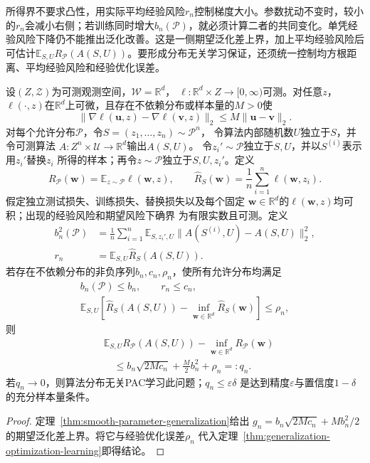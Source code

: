 所得界不要求凸性，用实际平均经验风险$r_n$控制梯度大小。参数扰动不变时，较小的$r_n$会减小右侧；若训练同时增大$b_n(\mathcal P)$，就必须计算二者的共同变化。单凭经验风险下降仍不能推出泛化改善。这是一侧期望泛化差上界，加上平均经验风险后可估计$\mathbb E_{S,U}R_{\mathcal P}(A(S,U))$。要形成分布无关学习保证，还须统一控制均方根距离、平均经验风险和经验优化误差。

\begin{theorem}[光滑损失下参数稳定性与可学习性]
\label{thm:smooth-parameter-learning}
设$(Z,\mathcal Z)$为可测观测空间，$\mathcal W=\mathbb R^d$，
$\ell:\mathbb R^d\times Z\to[0,\infty)$可测。对任意$z$，
$\ell(\cdot,z)$在$\mathbb R^d$上可微，且存在不依赖分布或样本量的$M>0$使
\[
 \|\nabla\ell(\bm u,z)-\nabla\ell(\bm v,z)\|_2
 \leq M\|\bm u-\bm v\|_2.
\]
对每个允许分布$\mathcal P$，令$S=(z_1,\ldots,z_n)\sim\mathcal P^n$，
令算法内部随机数$U$独立于$S$，并令可测算法
$A:Z^n\times\mathcal U\to\mathbb R^d$输出$A(S,U)$。
令$z_i'\sim\mathcal P$独立于$S,U$，并以$S^{(i)}$表示用$z_i'$替换$z_i$
所得的样本；再令$z\sim\mathcal P$独立于$S,U,z_i'$。定义
\[
 R_{\mathcal P}(\bm w)=\mathbb E_{z\sim\mathcal P}\ell(\bm w,z),
 \qquad
 \hat R_S(\bm w)=\frac1n\sum_{i=1}^n\ell(\bm w,z_i).
\]
假定独立测试损失、训练损失、替换损失以及每个固定
$\bm w\in\mathbb R^d$的$\ell(\bm w,z)$均可积；出现的经验风险和期望风险下确界
为有限实数且可测。定义
\[
\begin{aligned}
 b_n^2(\mathcal P)
 &=\frac1n\sum_{i=1}^n\mathbb E_{S,z_i',U}
   \|A(S^{(i)},U)-A(S,U)\|_2^2,\\
 r_n&=\mathbb E_{S,U}\hat R_S(A(S,U)).
\end{aligned}
\]
若存在不依赖分布的非负序列$b_n,c_n,\rho_n$，使所有允许分布均满足
\begin{gather*}
 b_n(\mathcal P)\leq b_n,\qquad r_n\leq c_n,\\
 \mathbb E_{S,U}[\hat R_S(A(S,U))-\inf_{\bm w\in\mathbb R^d}
 \hat R_S(\bm w)]\leq\rho_n,
\end{gather*}
则
\begin{align*}
 &\mathbb E_{S,U}R_{\mathcal P}(A(S,U))
 -\inf_{\bm w\in\mathbb R^d}R_{\mathcal P}(\bm w)\\
 &\quad\leq b_n\sqrt{2Mc_n}+\frac M2b_n^2+\rho_n=:q_n.
\end{align*}
若$q_n\to0$，则算法分布无关PAC学习此问题；$q_n\leq\varepsilon\delta$
是达到精度$\varepsilon$与置信度$1-\delta$的充分样本量条件。
\end{theorem}
\begin{proof}
定理~\ref{thm:smooth-parameter-generalization}给出
$g_n=b_n\sqrt{2Mc_n}+Mb_n^2/2$的期望泛化差上界。将它与经验优化误差$\rho_n$
代入定理~\ref{thm:generalization-optimization-learning}即得结论。
\end{proof}

